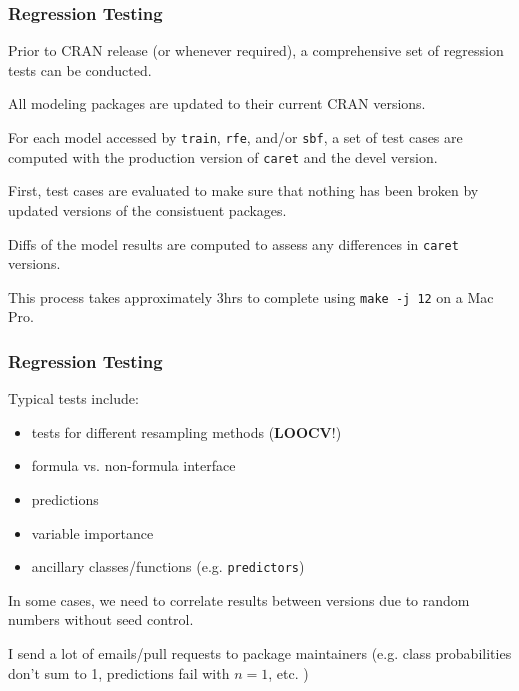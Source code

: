 \documentclass[12 pt]{beamer}\usepackage[]{graphicx}\usepackage[]{color}
\newcommand{\hlkwd}[1]{\textcolor[rgb]{0.78,0.227,0.412}{#1}}%
\newcommand{\mxkwd}[1]{\texttt{\hlkwd{#1}}}%
\newcommand{\pkg}[1]{{\fontseries{b}\selectfont #1}}
\renewcommand{\pkg}[1]{{\color{darkgreen}\texttt{#1}}}
\begin{document}

  \begin{frame}[fragile]
\frametitle{Regression Testing}

Prior to CRAN release (or whenever required), a comprehensive set of regression tests can be  conducted.

\vspace{.1in}

All modeling packages are updated to their current CRAN versions.

\vspace{.1in}

For each model accessed by \mxkwd{train}, \mxkwd{rfe}, and/or \mxkwd{sbf}, a set of test cases are computed with the production version of \pkg{caret} and the devel version.

\vspace{.1in}

First, test cases are evaluated to make sure that nothing has been broken by updated versions of the consistuent packages.

\vspace{.1in}

Diffs of the model results are computed to assess any differences in \pkg{caret} versions.

\vspace{.1in}

This process takes approximately 3hrs to complete using \texttt{make -j 12} on a Mac Pro.

\end{frame}



  \begin{frame}[fragile]
\frametitle{Regression Testing}

Typical tests include:
\begin{itemize}
\item tests for different resampling methods ({\bf LOOCV}!)
\item formula vs. non-formula interface
\item predictions
\item variable importance
\item ancillary classes/functions (e.g. \mxkwd{predictors})
\end{itemize}

\vspace{.1in}

In some cases, we need to correlate results between versions due to random numbers without seed control.

\vspace{.1in}

I send a lot of emails/pull requests to package maintainers (e.g. class probabilities don't sum to 1, predictions fail with $n=1$, etc. )

\end{frame}
\end{document}
